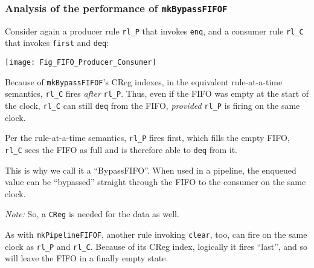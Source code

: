 
\begin{frame}[fragile]
\frametitle{Analysis of the performance of {\tt mkBypassFIFOF}}

\footnotesize

\begin{minipage}{0.45\textwidth}
  Consider again a producer rule \verb|rl_P| that invokes \verb|enq|, and a
  consumer rule \verb|rl_C| that invokes \verb|first| and \verb|deq|:
\end{minipage}
\hm
\begin{minipage}{0.5\textwidth}
  \texttt{[image: Fig\_FIFO\_Producer\_Consumer]}
\end{minipage}

\vspace{5ex}

Because of {\tt mkBypassFIFOF}'s CReg indexes, in the equivalent
rule-at-a-time semantics, \verb|rl_C| fires \emph{after} \verb|rl_P|.
Thus, even if the FIFO was empty at the start of the clock, \verb|rl_C|
can still \verb|deq| from the FIFO, \emph{provided} \verb|rl_P| is
firing on the same clock.

\vspace{1ex}

Per the rule-at-a-time semantics, \verb|rl_P| fires first, which fills
the empty FIFO, {\ie} \verb|rl_C| sees the FIFO as full and is
therefore able to \verb|deq| from it.

\vspace{1ex}

This is why we call it a ``BypassFIFO''.  When used in a pipeline, the
enqueued value can be ``bypassed'' straight through the FIFO to the
consumer on the same clock.

\hmm \emph{Note:} So, a {\tt CReg} is needed for the data as well.

\vspace{2ex}

As with {\tt mkPipelineFIFOF}, another rule invoking \verb|clear|,
too, can fire on the same clock as \verb|rl_P| and \verb|rl_C|.
Because of its CReg index, logically it fires ``last'', and so will
leave the FIFO in a finally empty state.

\end{frame}


